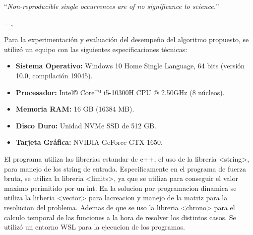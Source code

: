 
\epigraph{``\textit{Non-reproducible single occurrences are of no significance to
science.}''}{---\citeauthor{popper2005logic},\citeyear{popper2005logic} \cite{popper2005logic}}

Para la experimentación y evaluación del desempeño del algoritmo propuesto, se utilizó un equipo con las siguientes especificaciones técnicas:

\begin{itemize}
    \item \textbf{Sistema Operativo:} Windows 10 Home Single Language, 64 bits (versión 10.0, compilación 19045).
    \item \textbf{Procesador:} Intel® Core™ i5-10300H CPU @ 2.50GHz (8 núcleos).
    \item \textbf{Memoria RAM:} 16 GB (16384 MB).
    \item \textbf{Disco Duro:} Unidad NVMe SSD de 512 GB.
    \item \textbf{Tarjeta Gráfica:} NVIDIA GeForce GTX 1650. 
\end{itemize}

 

El programa utiliza las librerias estandar de c++, el uso de la libreria <string>, para manejo de los string de entrada. Especificamente en el programa de fuerza bruta, se utiliza la libreria <limits>, ya que se utiliza para conseguir el valor maximo perimitido por un int. En la solucion por programacion dinamica se utiliza la lirberia <vector> para lacreacion y manejo de la matriz para la resolucion del problema. Ademas de que se uso la libreria <chrono> para el calculo temporal de las funciones a la hora de resolver los distintos casos. Se utilizó un entorno WSL para la ejecucion de los programas.

